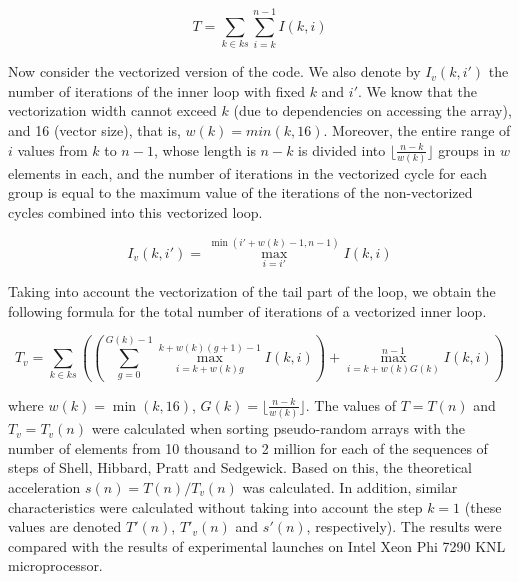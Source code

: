 \documentclass[
11pt,%
tightenlines,%
twoside,%
onecolumn,%
nofloats,%
nobibnotes,%
nofootinbib,%
superscriptaddress,%
noshowpacs,%
centertags]%
{revtex4}
\begin{document}
\begin{equation}
T = \sum_{k \in ks}{\sum_{i = k}^{n - 1}{I(k, i)}}
\end{equation}

Now consider the vectorized version of the code. We also denote by $ I_v (k, i') $ the number of iterations of the inner loop with fixed $ k $ and $ i' $.
We know that the vectorization width cannot exceed $ k $ (due to dependencies on accessing the array), and 16 (vector size), that is, $ w (k) = min (k, 16) $.
Moreover, the entire range of $ i $ values from $ k $ to $ n - 1 $, whose length is $ n - k $ is divided into $ \lfloor \frac {n - k} {w (k)} \rfloor $ groups in $ w $ elements in each, and the number of iterations in the vectorized cycle for each group is equal to the maximum value of the iterations of the non-vectorized cycles combined into this vectorized loop.

\begin{equation}
I_v(k, i') = \max_{i = i'}^{\min(i' + w(k) - 1, n - 1)}{I(k, i)}
\end{equation}

Taking into account the vectorization of the tail part of the loop, we obtain the following formula for the total number of iterations of a vectorized inner loop.

\begin{equation}
T_v = \sum_{k \in ks}
{
\left(
\left(
\sum_{g = 0}^{G(k) - 1}{\max_{i = k + w(k)g}^{k + w(k)(g + 1) - 1}{I(k, i)}}
\right)
+ \max_{i = k + w(k)G(k)}^{n - 1}{I(k, i)}
\right)
}
\end{equation}

where $ w (k) = \min (k, 16) $, $ G (k) = \lfloor \frac {n - k} {w (k)} \rfloor $. The values of $ T = T (n) $ and $ T_v = T_v (n) $ were calculated when sorting pseudo-random arrays with the number of elements from 10 thousand to 2 million for each of the sequences of steps of Shell, Hibbard, Pratt and Sedgewick. 
Based on this, the theoretical acceleration $ s (n) = T (n) / T_v (n) $ was calculated. 
In addition, similar characteristics were calculated without taking into account the step $ k = 1 $ (these values are denoted $ T '(n) $, $ T'_v (n) $ and $ s' (n) $, respectively). 
The results were compared with the results of experimental launches on Intel Xeon Phi 7290 KNL microprocessor.
\end{document}
